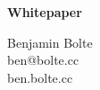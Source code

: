 \begin{center}
{\Large \textbf{Whitepaper}}

\vspace{0.2in}

Benjamin Bolte\\
ben@bolte.cc\\
ben.bolte.cc
\end{center}

\vspace{0.1in}

